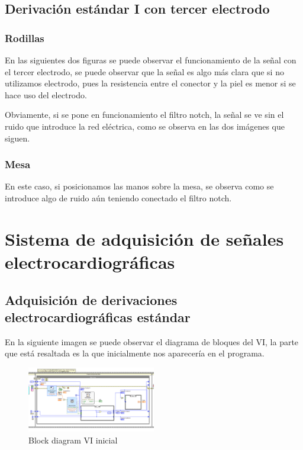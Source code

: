 \documentclass[conference]{IEEEtran}
\begin{document}
\subsection{Derivación estándar I con tercer electrodo}
\subsubsection{Rodillas}
En las siguientes dos figuras se puede observar el funcionamiento de la señal con el tercer electrodo, se puede observar que la señal es algo más clara que si no utilizamos electrodo, pues la resistencia entre el conector y la piel es menor si se hace uso del electrodo.

Obviamente, si se pone en funcionamiento el filtro notch, la señal se ve sin el ruido que introduce la red eléctrica, como se observa en las dos imágenes que siguen.


\subsubsection{Mesa}
En este caso, si posicionamos las manos sobre la mesa, se observa como se introduce algo de ruido aún teniendo conectado el filtro notch.
    
\section{Sistema de adquisición de señales electrocardiográficas}
\subsection{Adquisición de derivaciones electrocardiográficas estándar}
En la siguiente imagen se puede observar el diagrama de bloques del VI, la parte que está resaltada es la que inicialmente nos aparecería en el programa.
\begin{figure}[H]
    \centerline{\includegraphics[width=0.5\textwidth]{e_diagramVI.png}}
    \caption{Block diagram VI inicial}
    \end{figure}
\end{document}

